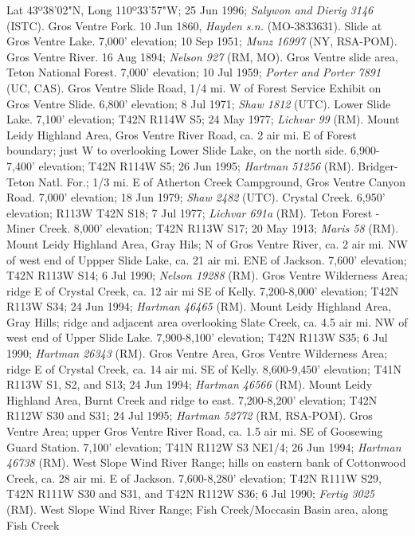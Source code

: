 Lat 43º38'02"N, Long 110º33'57"W; 25 Jun 1996;
\textit{Salywon and Dierig 3146} (ISTC).
Gros Ventre Fork. 10 Jun 1860, \textit{Hayden s.n.} (MO-3833631).
Slide at Gros Ventre Lake. 7,000' elevation; 10 Sep 1951;
\textit{Munz 16997} (NY, RSA-POM).
Gros Ventre River. 16 Aug 1894; \textit{Nelson 927} (RM, MO).
Gros Ventre slide area, Teton National Forest. 7,000' elevation; 10 Jul 1959;
\textit{Porter and Porter 7891} (UC, CAS).
Gros Ventre Slide Road, 1/4 mi. W of Forest Service Exhibit on Gros Ventre
Slide. 6,800' elevation; 8 Jul 1971; \textit{Shaw 1812} (UTC).
Lower Slide Lake. 7,100' elevation; T42N R114W S5; 24 May 1977;
\textit{Lichvar 99} (RM).
Mount Leidy Highland Area, Gros Ventre River Road, ca. 2 air mi. E of Forest
boundary; just W to overlooking Lower Slide Lake, on the north side.
6,900-7,400' elevation; T42N R114W S5; 26 Jun 1995;
\textit{Hartman 51256} (RM).
Bridger-Teton Natl. For.; 1/3 mi. E of Atherton Creek Campground, Gros Ventre
Canyon Road. 7,000' elevation; 18 Jun 1979; \textit{Shaw 2482} (UTC).
Crystal Creek. 6,950' elevation; R113W T42N S18; 7 Jul 1977;
\textit{Lichvar 691a} (RM).
Teton Forest - Miner Creek. 8,000' elevation; T42N R113W S17; 20 May 1913;
\textit{Maris 58} (RM).
Mount Leidy Highland Area, Gray Hils; N of Gros Ventre River, ca. 2 air mi.
NW of west end of Uppper Slide Lake, ca. 21 air mi. ENE of Jackson.
7,600' elevation; T42N R113W S14; 6 Jul 1990; \textit{Nelson 19288} (RM).
Gros Ventre Wilderness Area; ridge E of Crystal Creek, ca. 12 air mi
SE of Kelly. 7,200-8,000' elevation; T42N R113W S34; 24 Jun 1994;
\textit{Hartman 46465} (RM).
Mount Leidy Highland Area, Gray Hills; ridge and adjacent area overlooking
Slate Creek, ca. 4.5 air mi. NW of west end of Upper Slide Lake. 7,900-8,100'
elevation; T42N R113W S35; 6 Jul 1990; \textit{Hartman 26343} (RM).
Gros Ventre Area, Gros Ventre Wilderness Area; ridge E of Crystal Creek,
ca. 14 air mi. SE of Kelly. 8,600-9,450' elevation;
T41N R113W S1, S2, and S13; 24 Jun 1994; \textit{Hartman 46566} (RM).
Mount Leidy Highland Area, Burnt Creek and ridge to east.
7,200-8,200' elevation; T42N R112W S30 and S31; 24 Jul 1995;
\textit{Hartman 52772} (RM, RSA-POM).
Gros Ventre Area; upper Gros Ventre River Road, ca. 1.5 air mi. SE of
Goosewing Guard Station. 7,100' elevation; T41N R112W S3 NE1/4; 26 Jun 1994;
\textit{Hartman 46738} (RM).
West Slope Wind River Range; hills on eastern bank of Cottonwood Creek, ca.
28 air mi. E of Jackson. 7,600-8,280' elevation; T42N R111W S29, T42N R111W
S30 and S31, and T42N R112W S36; 6 Jul 1990; \textit{Fertig 3025} (RM).
West Slope Wind River Range; Fish Creek/Moccasin Basin area, along Fish Creek
